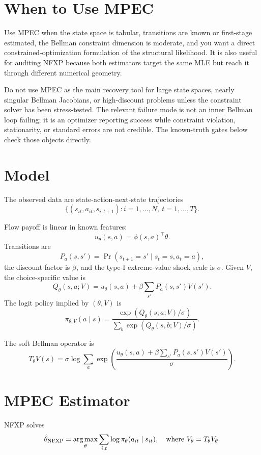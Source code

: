 \documentclass[10pt]{article}
\begin{document}
\section{When to Use MPEC}

Use MPEC when the state space is tabular, transitions are known or first-stage
estimated, the Bellman constraint dimension is moderate, and you want a direct
constrained-optimization formulation of the structural likelihood. It is also
useful for auditing NFXP because both estimators target the same MLE but reach
it through different numerical geometry.

Do not use MPEC as the main recovery tool for large state spaces, nearly
singular Bellman Jacobians, or high-discount problems unless the constraint
solver has been stress-tested. The relevant failure mode is not an inner
Bellman loop failing; it is an optimizer reporting success while constraint
violation, stationarity, or standard errors are not credible. The known-truth
gates below check those objects directly.

\section{Model}

The observed data are state-action-next-state trajectories
\[
\{(s_{it}, a_{it}, s_{i,t+1}) : i=1,\ldots,N,\ t=1,\ldots,T\}.
\]

Flow payoff is linear in known features:
\[
u_\theta(s,a) = \phi(s,a)^\top \theta.
\]
Transitions are
\[
P_a(s,s') = \Pr(s_{t+1}=s' \mid s_t=s, a_t=a),
\]
the discount factor is \(\beta\), and the type-I extreme-value shock scale is
\(\sigma\). Given \(V\), the choice-specific value is
\[
Q_\theta(s,a;V)
=
u_\theta(s,a)
+ \beta\sum_{s'}P_a(s,s')V(s').
\]
The logit policy implied by \((\theta,V)\) is
\[
\pi_{\theta,V}(a\mid s)
=
\frac{\exp(Q_\theta(s,a;V)/\sigma)}
{\sum_b \exp(Q_\theta(s,b;V)/\sigma)}.
\]

The soft Bellman operator is
\[
T_\theta V(s)
=
\sigma \log \sum_a
\exp\left(
\frac{u_\theta(s,a)+\beta\sum_{s'}P_a(s,s')V(s')}{\sigma}
\right).
\]

\section{MPEC Estimator}

NFXP solves
\[
\hat\theta_{\mathrm{NFXP}}
=
\operatorname*{arg\,max}_\theta
\sum_{i,t}\log\pi_\theta(a_{it}\mid s_{it}),
\quad
\text{where } V_\theta = T_\theta V_\theta.
\]
\end{document}

